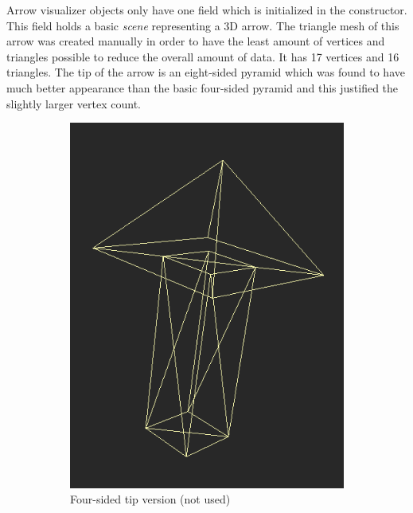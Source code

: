 Arrow visualizer objects only have one field which is initialized in the constructor. This field holds a basic {\it scene} representing a 3D arrow. The triangle mesh of this arrow was created manually in order to have the least amount of vertices and triangles possible to reduce the overall amount of data. It has 17 vertices and 16 triangles. The tip of the arrow is an eight-sided pyramid which was found to have much better appearance than the basic four-sided pyramid and this justified the slightly larger vertex count.

\begin{figure}[h]
\centering
	\begin{subfigure}{0.3\textwidth}
	\includegraphics[width=\textwidth]{./img/4sided_arrow.PNG}
    \caption{Four-sided tip version (not used)}
    \label{fig:4sided_arrow}
	\end{subfigure}
    \qquad
    \begin{subfigure}{0.3\textwidth}

\end{subfigure}
\end{figure}
